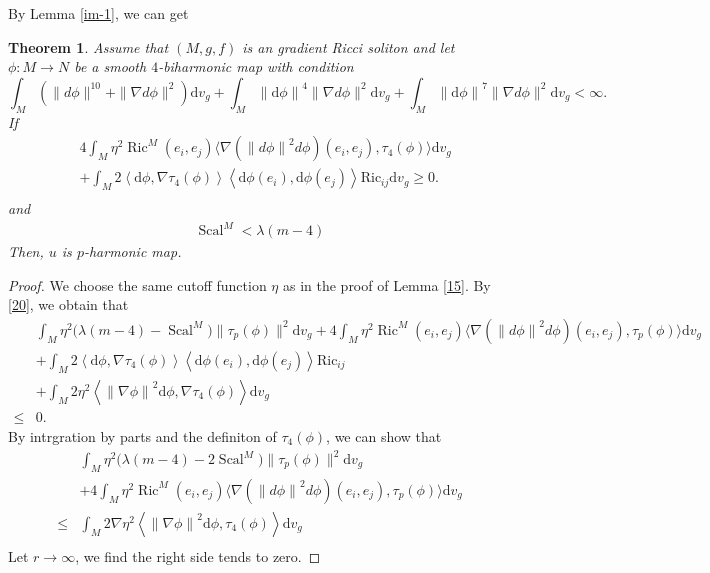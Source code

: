 \documentclass[12pt,UTF8]{article}
\theoremstyle{plain}
\newtheorem{thm}{Theorem}[section]
\theoremstyle{definition}
\def\d {\mathrm{d}}
\def\Ric {\mathrm{Ric}}
\def\na{\ensuremath{\nabla}}
\renewcommand{\d}[1]{\mathbb{#1}}
\renewcommand{\(}{\left(}
\renewcommand{\)}{\right)}
\renewcommand{\leq}{\leqslant}
\renewcommand{\geq}{\geqslant}
\newcommand{\norm}[1]{\left\lVert#1\right\rVert}%
\def\Ric{\mathrm{Ric\, }}
\numberwithin{equation}{subsection}
\def\na{\nabla}
\newcommand{\dv}{\operatorname{div}}
\renewcommand{\leq}{\leqslant}
\renewcommand{\geq}{\geqslant}
\renewcommand{\(}{\left(}
\renewcommand{\)}{\right)}
\def\d{\mathrm{d}}
\def \d {\mathrm{d}}
\def \Ric {\mathrm{Ric}}
\def\dv{\d v_g}
\numberwithin{equation}{section}
\begin{document}
By Lemma \ref{im-1}, we can get 
\begin{thm}\label{18}
	Assume that $(M,g,f)$ is an gradient Ricci soliton  and
	let $\phi\colon M\to N$ be a smooth $4$-biharmonic map with  condition 
	\begin{equation}\label{18}
		\int_M(\|d\phi\|^{10}+\|\na d\phi\|^2)\dv+\int_M\norm{\d \phi}^{4} \|\na d\phi\|^2 \dv+\int_M\norm{\d \phi}^{7} \|\na d\phi\|^2 \dv<\infty.
	\end{equation}
	 If 
	\begin{equation}
		\begin{split}			
			&4\int_M\eta^2\operatorname{Ric}^M(e_i,e_j)\langle\na \left(\norm{d\phi}^{2} d\phi \right)(e_i,e_j),\tau_4(\phi)\rangle \d v_g \\
			&+\int_M 2\left\langle \d \phi,\na \tau_4(\phi) \right\rangle\left\langle \d \phi(e_i),\d \phi(e_j) \right\rangle\Ric_{ij} \d v_g \geq 0.\\
		\end{split}
	\end{equation}
	and
	\begin{equation}
		\begin{split}
			\operatorname{Scal}^M<\lambda(m-4)
		\end{split}
	\end{equation}
Then, $u$ is $p$-harmonic map.
\end{thm}
\begin{proof}
We choose the same cutoff function $\eta$ as in the proof of Lemma \ref{15}. By \eqref{20}, we obtain that 
				\begin{equation}
				\begin{split}
						&\int_M\eta^2\big(\lambda(m-4)-\operatorname{Scal}^M\big)\|\tau_p(\phi)\|^2\dv+
					4\int_M\eta^2\operatorname{Ric}^M(e_i,e_j)\langle\na \left(\norm{d\phi}^{2} d\phi \right)(e_i,e_j),\tau_p(\phi)\rangle \dv \\
					&+\int_M 2\left\langle \d \phi,\na \tau_4(\phi) \right\rangle\left\langle \d \phi(e_i),\d \phi(e_j) \right\rangle\Ric_{ij}\\
					&+\int_M 2\eta^2\left\langle \norm{\na \phi}^2\d \phi,\na \tau_4(\phi) \right\rangle \dv\\
					\leq& 0.					
				\end{split}
			\end{equation}
	By intrgration by parts and the definiton of $\tau_4(\phi)$, we can show that 
		\begin{equation}
		\begin{split}
			&\int_M\eta^2\big(\lambda(m-4)-2\operatorname{Scal}^M\big)\|\tau_p(\phi)\|^2\dv\\
			&+
			4\int_M\eta^2\operatorname{Ric}^M(e_i,e_j)\langle\na \left(\norm{d\phi}^{2} d\phi \right)(e_i,e_j),\tau_p(\phi)\rangle \dv \\
									\leq  &\int_M 2\na\eta^2\left\langle \norm{\na \phi}^2\d \phi, \tau_4(\phi) \right\rangle \dv\\ 
										\end{split}
	\end{equation}
	Let $r\to \infty$, we find the right side tends to zero.	
\end{proof}
\end{document}
